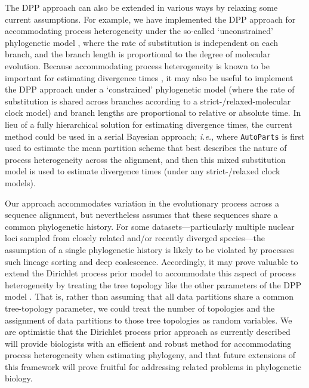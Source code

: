 \documentclass[11pt]{article}
\begin{document}
The DPP approach can also be extended in various ways by relaxing some current assumptions.
For example, we have implemented the DPP approach for accommodating process heterogeneity under the so-called `unconstrained' phylogenetic model \citep[{\it e.g.},][]{Heath14}, where the rate of substitution is independent on each branch, and the branch length is proportional to the degree of molecular evolution.
Because accommodating process heterogeneity is known to be important for estimating divergence times \citep[{\it e.g.},][]{marshall06,poux08,venditti08}, it may also be useful to implement the DPP approach under a `constrained' phylogenetic model (where the rate of substitution is shared across branches according to a strict-/relaxed-molecular clock model) and branch lengths are proportional to relative or absolute time. 
In lieu of a fully hierarchical solution for estimating divergence times, the current method could be used in a serial Bayesian approach; {\it i.e.}, where \verb!AutoParts! is first used to estimate the mean partition scheme that best describes the nature of process heterogeneity across the alignment, and then this mixed substitution model is used to estimate divergence times (under any strict-/relaxed clock models). 

Our approach accommodates variation in the evolutionary process across a sequence alignment, but nevertheless assumes that these sequences share a common phylogenetic history. 
For some datasets---particularly multiple nuclear loci sampled from closely related and/or recently diverged species---the assumption of a single phylogenetic history is likely to be violated by processes such lineage sorting and deep coalescence.  
Accordingly, it may prove valuable to extend the Dirichlet process prior model to accommodate this aspect of process heterogeneity by treating the tree topology like the other parameters of the DPP model \citep[\emph{c.f.}, ][]{ane07}.  
That is, rather than assuming that all data partitions share a common tree-topology parameter, we could treat the number of topologies and the assignment of data partitions to those tree topologies as random variables.  
We are optimistic that the Dirichlet process prior approach as currently described will provide biologists with an efficient and robust method for accommodating process heterogeneity when estimating phylogeny, and that future extensions of this framework will prove fruitful for addressing related problems in phylogenetic biology.

\bigskip
\end{document}
